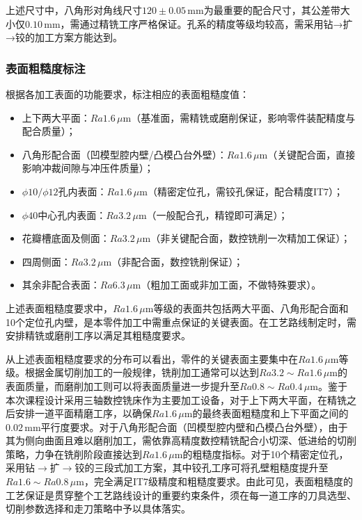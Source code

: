 \documentclass{xautCADreport}
\begin{document}
上述尺寸中，八角形对角线尺寸$120\pm0.05\,\mathrm{mm}$为最重要的配合尺寸，其公差带大小仅$0.10\,\mathrm{mm}$，需通过精铣工序严格保证。孔系的精度等级均较高，需采用钻→扩→铰的加工方案方能达到。

\subsubsection{表面粗糙度标注}

根据各加工表面的功能要求，标注相应的表面粗糙度值：
\begin{itemize}
  \item 上下两大平面：$Ra1.6\,\mu\mathrm{m}$（基准面，需精铣或磨削保证，影响零件装配精度与配合质量）；
  \item 八角形配合面（凹模型腔内壁/凸模凸台外壁）：$Ra1.6\,\mu\mathrm{m}$（关键配合面，直接影响冲裁间隙与冲压件质量）；
  \item $\phi10/\phi12$孔内表面：$Ra1.6\,\mu\mathrm{m}$（精密定位孔，需铰孔保证，配合精度IT7）；
  \item $\phi40$中心孔内表面：$Ra3.2\,\mu\mathrm{m}$（一般配合孔，精镗即可满足）；
  \item 花瓣槽底面及侧面：$Ra3.2\,\mu\mathrm{m}$（非关键配合面，数控铣削一次精加工保证）；
  \item 四周侧面：$Ra3.2\,\mu\mathrm{m}$（非配合面，数控铣削保证）；
  \item 其余非配合表面：$Ra6.3\,\mu\mathrm{m}$（粗加工面或非加工面，不做特殊要求）。
\end{itemize}

上述表面粗糙度要求中，$Ra1.6\,\mu\mathrm{m}$等级的表面共包括两大平面、八角形配合面和10个定位孔内壁，是本零件加工中需重点保证的关键表面。在工艺路线制定时，需安排精铣或磨削工序以满足其粗糙度要求。

从上述表面粗糙度要求的分布可以看出，零件的关键表面主要集中在$Ra1.6\,\mu\mathrm{m}$等级。根据金属切削加工的一般规律，铣削加工通常可以达到$Ra3.2\sim Ra1.6\,\mu\mathrm{m}$的表面质量，而磨削加工则可以将表面质量进一步提升至$Ra0.8\sim Ra0.4\,\mu\mathrm{m}$。鉴于本次课程设计采用三轴数控铣床作为主要加工设备，对于上下两大平面，在精铣之后安排一道平面精磨工序，以确保$Ra1.6\,\mu\mathrm{m}$的最终表面粗糙度和上下平面之间的$0.02\,\mathrm{mm}$平行度要求。对于八角形配合面（凹模型腔内壁和凸模凸台外壁），由于其为侧向曲面且难以磨削加工，需依靠高精度数控精铣配合小切深、低进给的切削策略，力争在铣削阶段直接达到$Ra1.6\,\mu\mathrm{m}$的粗糙度指标。对于10个精密定位孔，采用钻$\to$扩$\to$铰的三段式加工方案，其中铰孔工序可将孔壁粗糙度提升至$Ra1.6\sim Ra0.8\,\mu\mathrm{m}$，完全满足IT7级精度和粗糙度要求。由此可见，表面粗糙度的工艺保证是贯穿整个工艺路线设计的重要约束条件，须在每一道工序的刀具选型、切削参数选择和走刀策略中予以具体落实。
\end{document}
